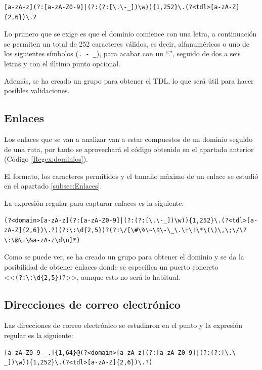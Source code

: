 \begin{lstlisting}[breaklines, caption={Expresión regular para capturar dominios}, label={Regex:dominios}, captionpos=b]
    [a-zA-z](?:[a-zA-Z0-9]|(?:(?:[\.\-_])\w)){1,252}\.(?<tdl>[a-zA-Z]{2,6})\.?
\end{lstlisting}

Lo primero que se exige es que el dominio comience con una letra, a continuación se permiten un total de 252 caracteres válidos, es decir, alfanuméricos o uno de los siguientes símbolos (\verb!. - _!), para acabar con un “.”, seguido de dos a seis letras y con el último punto opcional.

Además, se ha creado un grupo para obtener el TDL, lo que será útil para hacer posibles validaciones. 

\subsection{Enlaces}
Los enlaces que se van a analizar van a estar compuestos de un dominio seguido de una ruta, por tanto se aprovechará el código obtenido en el apartado anterior (Código \ref{Regex:dominios}). 

El formato, los caracteres permitidos y el tamaño máximo de un enlace se estudió en el apartado \ref{subsec:Enlaces}.

La expresión regular para capturar enlaces es la siguiente.
\begin{lstlisting}[breaklines, caption={Expresión regular para capturar enlaces}, label={Regex:enlaces}, captionpos=b]
    (?<domain>[a-zA-z](?:[a-zA-Z0-9]|(?:(?:[\.\-_])\w)){1,252}\.(?<tdl>[a-zA-Z]{2,6})\.?)(?:\:\d{2,5})?(?:\/[\#\%\~\$\-\_\.\+\!\*\(\)\,\;\/\?\:\@\=\&a-zA-z\d\n]*)
\end{lstlisting}

Como se puede ver, se ha creado un grupo para obtener el dominio y se da la posibilidad de obtener enlaces donde se especifica un puerto concreto <<\verb!(?:\:\d{2,5})?!>>, aunque esto no será lo habitual.

\subsection{Direcciones de correo electrónico}
Las direcciones de correo electrónico se estudiaron en el punto y la expresión regular es la siguiente: 
\begin{lstlisting}[breaklines, caption={Expresión regular para capturar direcciones de correo electrónico}, label={Regex:email}, captionpos=b]
    [a-zA-Z0-9-_.]{1,64}@(?<domain>[a-zA-z](?:[a-zA-Z0-9]|(?:(?:[\.\-_])\w)){1,252}\.(?<tdl>[a-zA-Z]{2,6})\.?)
\end{lstlisting}

